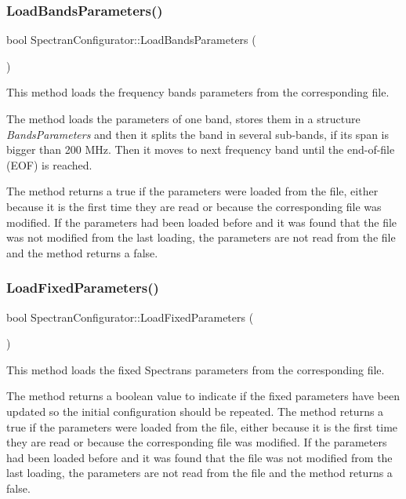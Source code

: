 \subsubsection{\texorpdfstring{Load\+Bands\+Parameters()}{LoadBandsParameters()}}
{\footnotesize\ttfamily bool Spectran\+Configurator\+::\+Load\+Bands\+Parameters (\begin{DoxyParamCaption}{ }\end{DoxyParamCaption})}



This method loads the frequency bands parameters from the corresponding file. 

The method loads the parameters of one band, stores them in a structure {\itshape Bands\+Parameters} and then it splits the band in several sub-\/bands, if its span is bigger than 200 M\+Hz. Then it moves to next frequency band until the end-\/of-\/file (E\+OF) is reached.

The method returns a {\ttfamily true} if the parameters were loaded from the file, either because it is the first time they are read or because the corresponding file was modified. If the parameters had been loaded before and it was found that the file was not modified from the last loading, the parameters are not read from the file and the method returns a {\ttfamily false}. \mbox{\label{classSpectranConfigurator_ab3dfc0843d10b2e9bad09f599165d6ff}} 
\subsubsection{\texorpdfstring{Load\+Fixed\+Parameters()}{LoadFixedParameters()}}
{\footnotesize\ttfamily bool Spectran\+Configurator\+::\+Load\+Fixed\+Parameters (\begin{DoxyParamCaption}{ }\end{DoxyParamCaption})}



This method loads the fixed Spectran\textquotesingle{}s parameters from the corresponding file. 

The method returns a boolean value to indicate if the fixed parameters have been updated so the initial configuration should be repeated. The method returns a {\ttfamily true} if the parameters were loaded from the file, either because it is the first time they are read or because the corresponding file was modified. If the parameters had been loaded before and it was found that the file was not modified from the last loading, the parameters are not read from the file and the method returns a {\ttfamily false}. \mbox{\label{classSpectranConfigurator_a7402a16a8514a0c1b230164b7f5d9d21}} 

